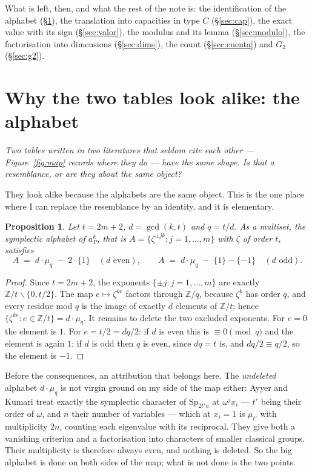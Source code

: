 \documentclass[11pt,a4paper]{article}
\newtheorem{proposition}[theorem]{Proposition}
\theoremstyle{definition}
\newcommand{\Sp}{\mathrm{Sp}}
\newcommand{\ZZ}{\mathbb{Z}}
\begin{document}
\noindent What is left, then, and what the rest of the note is: the identification of the alphabet
(\S\ref{sec:alph}), the translation into capacities in type $C$ (\S\ref{sec:cap}), the exact value
with its sign (\S\ref{sec:valor}), the modulus and its lemma (\S\ref{sec:modulo}), the
factorisation into dimensions (\S\ref{sec:dims}), the count
(\S\ref{sec:cuenta}) and $G_2$ (\S\ref{sec:g2}).

\section{Why the two tables look alike: the alphabet}\label{sec:alph}

\noindent\emph{Two tables written in two literatures that seldom cite each other --- Figure~\ref{fig:map} records where they do --- have the same shape. Is that a resemblance, or are they about the same object?}

They look alike because the alphabets are the same object. This is the one place where I can replace
the resemblance by an identity, and it is elementary.

\begin{proposition}\label{prop:alph}
Let $t=2m+2$, $d=\gcd(k,t)$ and $q=t/d$. As a multiset, the symplectic alphabet of $a_P^k$, that is
$A=\{\zeta^{\pm jk}: j=1,\dots,m\}$ with $\zeta$ of order $t$, satisfies
\[
A \;=\; d\cdot\mu_q \;-\; 2\cdot\{1\} \quad (d \text{ even}),
\qquad
A \;=\; d\cdot\mu_q \;-\;\{1\}-\{-1\} \quad (d \text{ odd}).
\]
\end{proposition}

\begin{proof}
Since $t=2m+2$, the exponents $\{\pm j : j=1,\dots,m\}$ are exactly $\ZZ/t\smallsetminus\{0,t/2\}$.
The map $e\mapsto\zeta^{ke}$ factors through $\ZZ/q$, because $\zeta^k$ has order $q$, and every
residue mod $q$ is the image of exactly $d$ elements of $\ZZ/t$; hence
$\{\zeta^{ke}: e\in\ZZ/t\}=d\cdot\mu_q$. It remains to delete the two excluded exponents. For $e=0$
the element is $1$. For $e=t/2=dq/2$: if $d$ is even this is $\equiv 0 \pmod q$ and the element is
again $1$; if $d$ is odd then $q$ is even, since $dq=t$ is, and $dq/2\equiv q/2$, so the element is
$-1$.
\end{proof}

\noindent Before the consequences, an attribution that belongs here. The \emph{undeleted}
alphabet $d\cdot\mu_q$ is not virgin ground on my side of the map either: Ayyer and Kumari
\cite{AK22} treat exactly the symplectic character of $\Sp_{2t'n}$ at $\omega^j x_i$ --- $t'$ being
their order of $\omega$, and $n$ their number of variables --- which at $x_i=1$ is $\mu_{t'}$ with
multiplicity $2n$, counting each eigenvalue with its reciprocal. They give both a vanishing
criterion and a factorisation into characters of smaller classical groups. Their multiplicity is
therefore always even, and nothing is deleted. So the
big alphabet is done on both sides of the map; what is not done is the two points.
\end{document}
